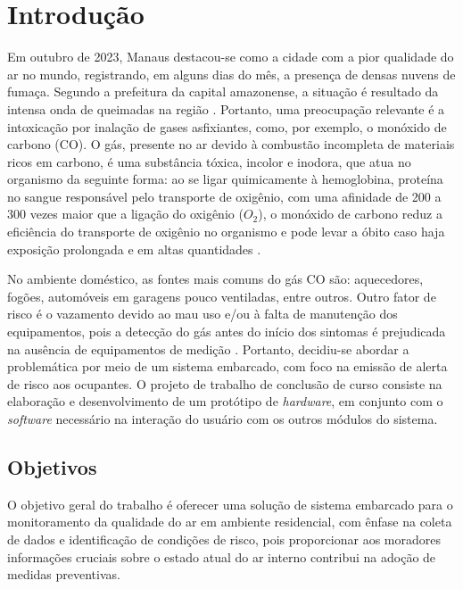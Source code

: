 \chapter{Introdução}

Em outubro de 2023, Manaus destacou-se como a cidade com a pior qualidade do ar no mundo, registrando, em alguns dias do mês, a presença 
de densas nuvens de fumaça. Segundo a prefeitura da capital amazonense, a situação é resultado da 
intensa onda de queimadas na região \cite{G1-ar-manaus}. Portanto, uma preocupação relevante 
é a intoxicação por inalação de gases asfixiantes, como, por exemplo, o monóxido de carbono (CO). O gás, presente no ar devido à combustão 
incompleta de materiais ricos em carbono, é uma substância tóxica, incolor e inodora, que atua no organismo da 
seguinte forma: ao se ligar quimicamente à hemoglobina, proteína no sangue responsável pelo transporte de oxigênio, com uma afinidade de 
200 a 300 vezes maior que a ligação do oxigênio ($O_{2}$), o monóxido de carbono reduz a eficiência do transporte de oxigênio no organismo e 
pode levar a óbito caso haja exposição prolongada e em altas quantidades \cite{carbon-monoxide-poisoning-varon}.

No ambiente doméstico, as fontes mais comuns do gás CO são: aquecedores, fogões, automóveis 
em garagens pouco ventiladas, entre outros. Outro fator de risco é o vazamento devido ao mau 
uso e/ou à falta de manutenção dos equipamentos, pois a detecção do gás antes do início dos 
sintomas é prejudicada na ausência de equipamentos de medição \cite{bio-sufocantes-hernandez2022}. Portanto, 
decidiu-se abordar a problemática por meio de um sistema embarcado, com foco na emissão de 
alerta de risco aos ocupantes. O projeto de trabalho de conclusão de curso consiste na elaboração e 
desenvolvimento de um protótipo de \textit{hardware}, em conjunto com o \textit{software} necessário na 
interação do usuário com os outros módulos do sistema. 

\section{Objetivos}

O objetivo geral do trabalho é oferecer uma solução de sistema embarcado para o monitoramento da qualidade do ar em ambiente residencial, com 
ênfase na coleta de dados e identificação de condições de risco, pois proporcionar aos moradores informações cruciais sobre o estado atual do ar interno 
contribui na adoção de medidas preventivas.

